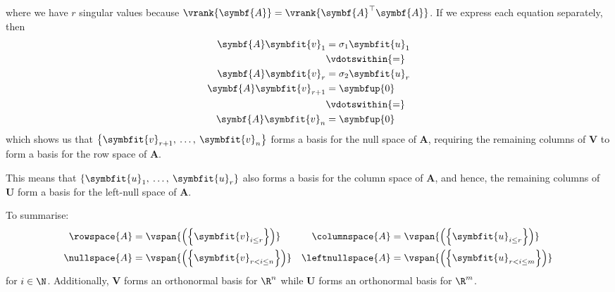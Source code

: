 \documentclass{article}
\begin{document}
where we have \(r\) singular values because \(\vrank{\symbf{A}} = \vrank{\symbf{A}^\top \symbf{A}}\).
If we express each equation separately, then
\begin{align*}
    \symbf{A} \symbfit{v}_1       & = \sigma_1 \symbfit{u}_1 \\
                                  & \vdotswithin{=}          \\
    \symbf{A} \symbfit{v}_r       & = \sigma_2 \symbfit{u}_r \\
    \symbf{A} \symbfit{v}_{r + 1} & = \symbfup{0}            \\
                                  & \vdotswithin{=}          \\
    \symbf{A} \symbfit{v}_{n}     & = \symbfup{0}
\end{align*}
which shows us that \(\left\{\symbfit{v}_{r+1},\: \dots,\: \symbfit{v}_{n}\right\}\) forms a basis for the null space of \(\symbf{A}\),
requiring the remaining columns of \(\symbf{V}\) to form a basis for the row space of \(\symbf{A}\).

This means that \(\left\{\symbfit{u}_{1},\: \dots,\: \symbfit{u}_{r}\right\}\) also forms a basis for the column space of \(\symbf{A}\),
and hence, the remaining columns of \(\symbf{U}\) form a basis for the left-null space of \(\symbf{A}\).

To summarise:
\begin{align*}
    \rowspace{A}  & = \vspan{\left( \left\{ \symbfit{v}_{i \leq r} \right\} \right)}     & \columnspace{A}   & = \vspan{\left( \left\{ \symbfit{u}_{i \leq r} \right\} \right)}     \\
    \nullspace{A} & = \vspan{\left( \left\{ \symbfit{v}_{r < i \leq n} \right\} \right)} & \leftnullspace{A} & = \vspan{\left( \left\{ \symbfit{u}_{r < i \leq m} \right\} \right)}
\end{align*}
for \(i \in \N\). Additionally, \(\symbf{V}\) forms an orthonormal basis for \(\R^n\) while
\(\symbf{U}\) forms an orthonormal basis for \(\R^m\).
\end{document}

